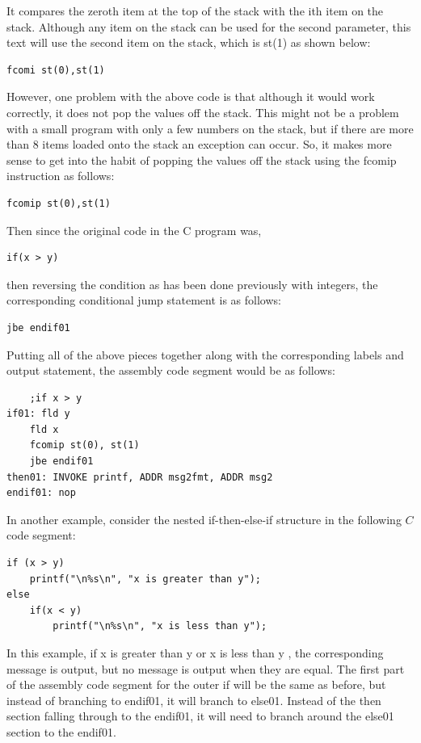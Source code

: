 \documentclass[10pt]{book}
\begin{document}
It compares the zeroth item at the top of the stack with the ith item on the stack. Although any item on the stack can be used for the second parameter, this text will use the second item on the stack, which is st(1) as shown below:
\begin{verbatim}
fcomi st(0),st(1)
\end{verbatim}

However, one problem with the above code is that although it would work correctly, it does not pop the values off the stack. This might not be a problem with a small program with only a few numbers on the stack, but if there are more than 8 items loaded onto the stack an exception can occur. So, it makes more sense to get into the habit of popping the values off the stack using the fcomip instruction as follows:
\begin{verbatim}
fcomip st(0),st(1)
\end{verbatim}

Then since the original code in the C program was,

\begin{verbatim}
if(x > y)
\end{verbatim}

then reversing the condition as has been done previously with integers, the corresponding conditional jump statement is as follows:

\begin{verbatim}
jbe endif01
\end{verbatim}

Putting all of the above pieces together along with the corresponding labels and output statement, the assembly code segment would be as follows:

\begin{verbatim}
    ;if x > y
if01: fld y
    fld x
    fcomip st(0), st(1)
    jbe endif01
then01: INVOKE printf, ADDR msg2fmt, ADDR msg2
endif01: nop
\end{verbatim}

In another example, consider the nested if-then-else-if structure in the following $C$ code segment:

\begin{verbatim}
if (x > y)
    printf("\n%s\n", "x is greater than y");
else
    if(x < y)
        printf("\n%s\n", "x is less than y");
\end{verbatim}

In this example, if x is greater than y or x is less than y , the corresponding message is output, but no message is output when they are equal. The first part of the assembly code segment for the outer if will be the same as before, but instead of branching to endif01, it will branch to else01. Instead of the then section falling through to the endif01, it will need to branch around the else01 section to the endif01.
\end{document}
